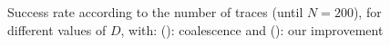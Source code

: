 \documentclass[conference,twocolumn]{IEEEtran}
\begin{document}
\begin{figure}
   
    \caption{Success rate according to the number of traces (\colorbox[rgb]{0.9,0.9,0.9} {until $N=200$}), for different values of $D$, with: ({\color{blue}{$\bullet$}}): coalescence and ({\color{red}{$\bullet$}}): our improvement}
    
    \label{fig:200}
\end{figure}
\end{document}
